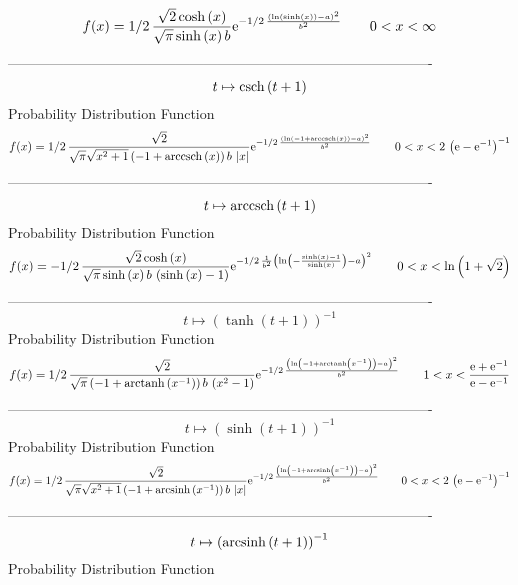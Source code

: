 \documentclass[12pt]{article}
\begin{document}
$$  f(x)=1/2\,{\frac {\sqrt {2}\cosh \left( x \right) }{\sqrt {\pi}\sinh
 \left( x \right) b}{{\rm e}^{-1/2\,{\frac { \left( \ln  \left( \sinh
 \left( x \right)  \right) -a \right) ^{2}}{{b}^{2}}}}}}
 \qquad0
 < x < \infty 
$$-------------------------------------------------------------------------------------------  \\$$t\mapsto {\rm csch} \left(t+1\right)
$$Probability Distribution Function 
$$  f(x)=1/2\,{\frac {\sqrt {2}}{\sqrt {\pi}\sqrt {{x}^{2}+1} \left( -1+
{\rm arccsch} \left(x\right) \right) b\, \left| x \right| }{{\rm e}^{-
1/2\,{\frac { \left( \ln  \left( -1+{\rm arccsch} \left(x\right)
 \right) -a \right) ^{2}}{{b}^{2}}}}}}
 \qquad0
 < x < 2\, \left( {\rm e}-{{\rm e}^{-1}} \right) ^{-1}
$$-------------------------------------------------------------------------------------------  \\$$t\mapsto {\rm arccsch} \left(t+1\right)
$$Probability Distribution Function 
$$  f(x)=-1/2\,{\frac {\sqrt {2}\cosh \left( x \right) }{\sqrt {\pi}\sinh
 \left( x \right) b\, \left( \sinh \left( x \right) -1 \right) }{
{\rm e}^{-1/2\,{\frac {1}{{b}^{2}} \left( \ln  \left( -{\frac {\sinh
 \left( x \right) -1}{\sinh \left( x \right) }} \right) -a \right) ^{2
}}}}}
 \qquad0
 < x < \ln  \left( 1+\sqrt {2} \right) 
$$-------------------------------------------------------------------------------------------  \\$$t\mapsto  \left( \tanh \left( t+1 \right)  \right) ^{-1}
$$Probability Distribution Function 
$$  f(x)=1/2\,{\frac {\sqrt {2}}{\sqrt {\pi} \left( -1+{\rm arctanh} \left({x}^
{-1}\right) \right) b\, \left( {x}^{2}-1 \right) }{{\rm e}^{-1/2\,{
\frac { \left( \ln  \left( -1+{\rm arctanh} \left({x}^{-1}\right)
 \right) -a \right) ^{2}}{{b}^{2}}}}}}
 \qquad1
 < x < {\frac {{\rm e}+{{\rm e}^{-1}}}{{\rm e}-{{\rm e}^{-1}}}}
$$-------------------------------------------------------------------------------------------  \\$$t\mapsto  \left( \sinh \left( t+1 \right)  \right) ^{-1}
$$Probability Distribution Function 
$$  f(x)=1/2\,{\frac {\sqrt {2}}{\sqrt {\pi}\sqrt {{x}^{2}+1} \left( -1+
{\rm arcsinh} \left({x}^{-1}\right) \right) b\, \left| x \right| }{
{\rm e}^{-1/2\,{\frac { \left( \ln  \left( -1+{\rm arcsinh} \left({x}^
{-1}\right) \right) -a \right) ^{2}}{{b}^{2}}}}}}
 \qquad0
 < x < 2\, \left( {\rm e}-{{\rm e}^{-1}} \right) ^{-1}
$$-------------------------------------------------------------------------------------------  \\$$t\mapsto  \left( {\rm arcsinh} \left(t+1\right) \right) ^{-1}
$$Probability Distribution Function 
\end{document}
